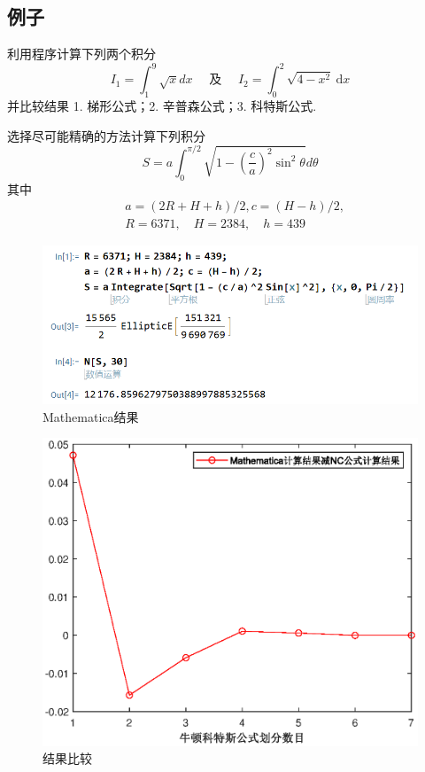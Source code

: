 \subsection*{例子}
\begin{ex}
	利用程序计算下列两个积分
	$$
	I_1=\int_1^9 \sqrt{x} d x \quad \text { 及 } \quad I_2=\int_0^2 \sqrt{4-x^2} \mathrm{~d} x
	$$
	并比较结果
	1. 梯形公式；2. 辛普森公式；3. 科特斯公式.
\end{ex}

\begin{ex}
	选择尽可能精确的方法计算下列积分
	$$
	S=a \int_0^{\pi / 2} \sqrt{1-\left(\frac{c}{a}\right)^2 \sin ^2 \theta} d \theta
	$$
	其中
	$$
	\begin{aligned}
		& a=(2 R+H+h) / 2, c=(H-h) / 2, \\
		& R=6371, \quad H=2384, \quad h=439
	\end{aligned}
	$$
\end{ex}
\begin{figure}[H]
	\centering
	\includegraphics[width = 0.8\linewidth]{w11/fig.png}
	\caption{Mathematica结果}
\end{figure}

\begin{figure}[H]
	\centering
	\includegraphics[width = 0.61\linewidth]{w11/fig.eps}
	\caption{结果比较}
\end{figure}

